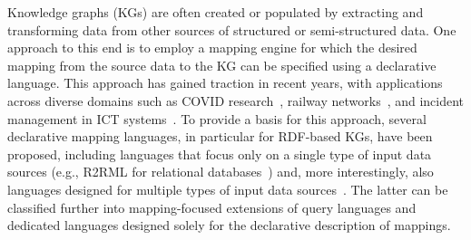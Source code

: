 Knowledge graphs (KGs) are often created or populated by extracting and transforming data from other sources of structured or semi-structured data. One approach to this end is to
	employ a mapping engine for which the desired mapping from the source data to the KG can be specified using a declarative language.
		This approach has gained traction in recent years, with applications across diverse domains such as COVID research~\cite{Sakor2023KG4Covid}, railway networks~\cite{rojas2021leveraging}, and incident management in ICT systems~\cite{Tailhardat2024NORIA}. To provide a basis for this approach, several declarative mapping languages, in particular for RDF-based KGs, have been proposed,
%
including languages that focus only on a single type of input data sources (e.g., R2RML for relational databases~\cite{Seema2012R2RML}) and, more interestingly, also languages designed for multiple types of input data sources~\cite{VanAssche2022DeclarativeRDFgraph}. The latter can be classified further into mapping-focused extensions of query languages and dedicated languages
designed solely for the declarative description of mappings.%



